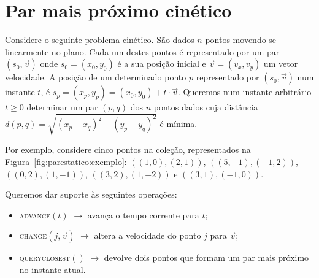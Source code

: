 

\chapter{Par mais próximo cinético}\label{ch:par-mais-proximo-cinetico}

Considere o seguinte problema cinético.
São dados $n$ pontos movendo-se linearmente no plano.
Cada um destes pontos é representado por um par $(s_0, \vec{v})$ onde $s_0 = (x_0, y_0)$ é a sua
posição inicial e $\vec{v} = (v_x, v_y)$ um vetor velocidade.
A posição de um determinado ponto $p$ representado por $(s_0, \vec{v})$ num instante $t$, é
$s_p = (x_p, y_p) = (x_0, y_0) + t\cdot \vec{v}$.
Queremos num instante arbitrário $t \geq 0$ determinar um par $(p,q)$ dos $n$ pontos dados cuja
distância $d(p, q) = \sqrt{(x_p - x_q)^2 + (y_p - y_q)^2}$ é mínima.

Por exemplo, considere cinco pontos na coleção, representados na
Figura~\ref{fig:parestatico:exemplo}: $((1, 0), (2, 1))$, $((5, -1),
(-1, 2))$, $((0, 2), (1, -1))$, $((3, 2), (1, -2))$ e $((3, 1), (-1,
0))$.



Queremos dar suporte às seguintes operações:
\begin{itemize}
    \item \textsc{advance}$(t)$ $\rightarrow$ avança o tempo corrente
    para $t$;
    \item \textsc{change}$(j, \vec{v})$ $\rightarrow$ altera a
    velocidade do ponto $j$ para $\vec{v}$;
    \item \textsc{query\textunderscore closest}$()$ $\rightarrow$
    devolve dois pontos que formam um par mais próximo no instante
    atual.
\end{itemize}



